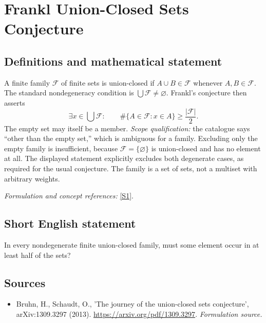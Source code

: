 \documentclass[11pt]{article}
\begin{document}
\section*{\texorpdfstring{Frankl Union-Closed Sets Conjecture}{Frankl Union-Closed Sets Conjecture}}\label{411}
\subsection{Definitions and mathematical statement}
A finite family $\mathcal F$ of finite sets is union-closed if $A\cup B\in\mathcal F$ whenever $A,B\in\mathcal F$. The standard nondegeneracy condition is $\bigcup\mathcal F\ne\varnothing$. Frankl's conjecture then asserts
\[
 \exists x\in\bigcup\mathcal F:\qquad
 \#\{A\in\mathcal F:x\in A\}\ge\frac{|\mathcal F|}{2}.
\]
The empty set may itself be a member. \emph{Scope qualification:} the catalogue says ``other than the empty set,'' which is ambiguous for a family. Excluding only the empty family is insufficient, because $\mathcal F=\{\varnothing\}$ is union-closed and has no element at all. The displayed statement explicitly excludes both degenerate cases, as required for the usual conjecture. The family is a set of sets, not a multiset with arbitrary weights.
\par\smallskip\textit{Formulation and concept references:} \href{https://arxiv.org/pdf/1309.3297}{[S1]}.

\subsection{Short English statement}
In every nondegenerate finite union-closed family, must some element occur in at least half of the sets?
\subsection{Sources}
\begin{itemize}
\item[S1]Bruhn, H., Schaudt, O., 'The journey of the union-closed sets conjecture', arXiv:1309.3297 (2013).
\url{https://arxiv.org/pdf/1309.3297}.
\textit{Formulation source.}
\end{itemize}
\end{document}
